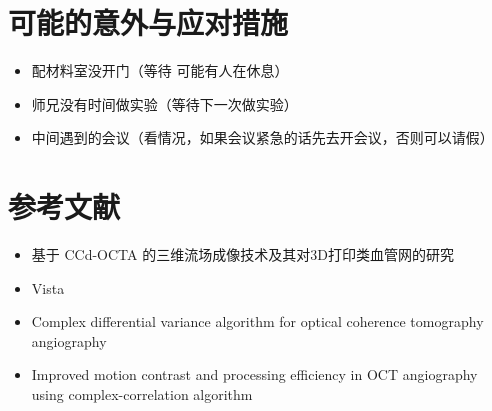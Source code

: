\documentclass[12pt]{article}
\begin{document}
\section{可能的意外与应对措施}
\begin{itemize}

    \item 配材料室没开门（等待 可能有人在休息）
    \item 师兄没有时间做实验（等待下一次做实验）
    \item 中间遇到的会议（看情况，如果会议紧急的话先去开会议，否则可以请假）
\end{itemize}

\section{参考文献}

\begin{itemize}
    \item 基于 CCd-OCTA 的三维流场成像技术及其对3D打印类血管网的研究 
    \item Vista
    \item Complex differential variance algorithm for optical coherence tomography angiography
    \item Improved motion contrast and processing efficiency in OCT angiography using complex-correlation algorithm
\end{itemize}
\end{document}

